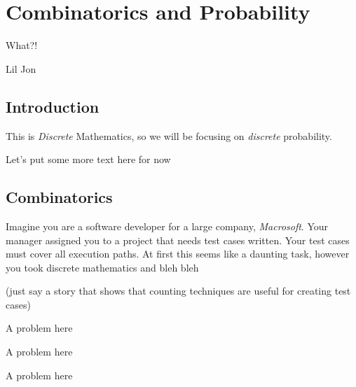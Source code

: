 \documentclass[main.tex]{subfiles}
\begin{document}
\chapter{Combinatorics and Probability}

\epigraph{What?!}{Lil Jon}

\minitoc

\section{Introduction}

This is \textit{Discrete} Mathematics, so we will be focusing on \textit{discrete} probability.

Let's put some more text here for now

\section{Combinatorics}

Imagine you are a software developer for a large company, \textit{Macrosoft}. Your manager assigned you to a project that needs test cases written. Your test cases must cover all execution paths. At first this seems like a daunting task, however you took discrete mathematics and bleh bleh 

(just say a story that shows that counting techniques are useful for creating test cases)

\begin{defn}
	
\end{defn}

\begin{example}
	A problem here
\end{example}

\begin{defn}
	
\end{defn}

\begin{example}
	A problem here
\end{example}

\begin{defn}
	
\end{defn}

\begin{example}
	A problem here
\end{example}
\end{document}
